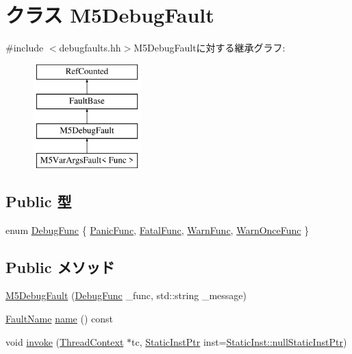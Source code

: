 \hypertarget{classGenericISA_1_1M5DebugFault}{
\section{クラス M5DebugFault}
\label{classGenericISA_1_1M5DebugFault}
}


{\ttfamily \#include $<$debugfaults.hh$>$}M5DebugFaultに対する継承グラフ:\begin{figure}[H]
\begin{center}
\leavevmode
\includegraphics[height=4cm]{classGenericISA_1_1M5DebugFault}
\end{center}
\end{figure}
\subsection*{Public 型}
\begin{DoxyCompactItemize}
\item 
enum \hyperlink{classGenericISA_1_1M5DebugFault_a3def298b580826ef5e4bedf55e93cef4}{DebugFunc} \{ \hyperlink{classGenericISA_1_1M5DebugFault_a3def298b580826ef5e4bedf55e93cef4ab28c48f2592a48cb70b1357f93fd4ac0}{PanicFunc}, 
\hyperlink{classGenericISA_1_1M5DebugFault_a3def298b580826ef5e4bedf55e93cef4a2367eece711cd83ec52d23fe31093b8b}{FatalFunc}, 
\hyperlink{classGenericISA_1_1M5DebugFault_a3def298b580826ef5e4bedf55e93cef4acd36c5235a0c3bb96eb424cee4e11f90}{WarnFunc}, 
\hyperlink{classGenericISA_1_1M5DebugFault_a3def298b580826ef5e4bedf55e93cef4a3fb1a2e43ec8ecb561a94cb37d2c252a}{WarnOnceFunc}
 \}
\end{DoxyCompactItemize}
\subsection*{Public メソッド}
\begin{DoxyCompactItemize}
\item 
\hyperlink{classGenericISA_1_1M5DebugFault_ac84f0fd05bf094d9083fac60967d074d}{M5DebugFault} (\hyperlink{classGenericISA_1_1M5DebugFault_a3def298b580826ef5e4bedf55e93cef4}{DebugFunc} \_\-func, std::string \_\-message)
\item 
\hyperlink{sim_2faults_8hh_abb196df64725e5c2568c900cf130d8d7}{FaultName} \hyperlink{classGenericISA_1_1M5DebugFault_a73adb23259baf912a81683a9790a303f}{name} () const 
\item 
void \hyperlink{classGenericISA_1_1M5DebugFault_a2bd783b42262278d41157d428e1f8d6f}{invoke} (\hyperlink{classThreadContext}{ThreadContext} $\ast$tc, \hyperlink{classRefCountingPtr}{StaticInstPtr} inst=\hyperlink{classStaticInst_aa793d9793af735f09096369fb17567b6}{StaticInst::nullStaticInstPtr})
\end{DoxyCompactItemize}
